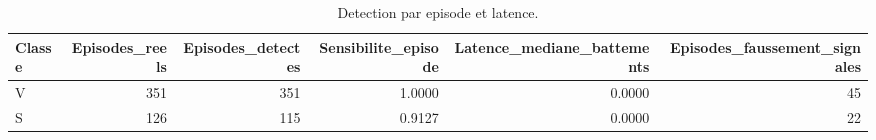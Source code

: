 \begin{table}
\caption{Detection par episode et latence.}
\label{tab:episodes}
\begin{tabular}{lrrrrr}
\toprule
Classe & Episodes_reels & Episodes_detectes & Sensibilite_episode & Latence_mediane_battements & Episodes_faussement_signales \\
\midrule
V & 351 & 351 & 1.0000 & 0.0000 & 45 \\
S & 126 & 115 & 0.9127 & 0.0000 & 22 \\
\bottomrule
\end{tabular}
\end{table}
